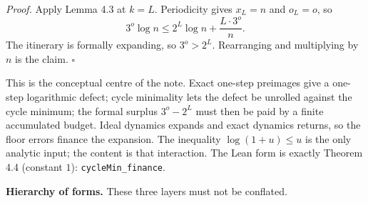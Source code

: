 \documentclass[12pt]{article}
\begin{document}
\emph{Proof.} Apply Lemma 4.3 at \(k=L\). Periodicity gives \(x_L=n\)
and \(o_L=o\), so \[
3^o\log n\le 2^L\log n+\frac{L\cdot 3^o}{n}.
\] The itinerary is formally expanding, so \(3^o>2^L\). Rearranging and
multiplying by \(n\) is the claim. \(\square\)

\vspace{0.4em}

This is the conceptual centre of the note. Exact one-step preimages give
a one-step logarithmic defect; cycle minimality lets the defect be
unrolled against the cycle minimum; the formal surplus \(3^o-2^L\) must
then be paid by a finite accumulated budget. Ideal dynamics expands and
exact dynamics returns, so the floor errors finance the expansion. The
inequality \(\log(1+u)\le u\) is the only analytic input; the content is
that interaction. The Lean form is exactly Theorem 4.4 (constant \(1\)):
\texttt{\nolinkurl{cycleMin_finance}}.

\textbf{Hierarchy of forms.} These three layers must not be conflated.
\end{document}
